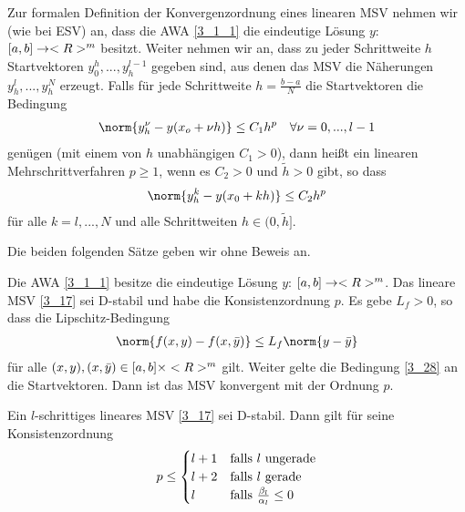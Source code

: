 Zur formalen Definition der Konvergenzordnung eines linearen MSV nehmen wir (wie bei ESV) an, dass die AWA \cref{3_1_1} die eindeutige Lösung $y$: $[a,b]\to<R>^m$ besitzt. Weiter nehmen wir an, dass zu jeder Schrittweite $h$ Startvektoren $y_0^h,...,y_h^{l-1}$ gegeben sind, aus denen das MSV die Näherungen $y_h^l,...,y_h^N$ erzeugt. Falls für jede Schrittweite $h=\frac{b-a}{N}$ die Startvektoren die Bedingung
\begin{align}
	\label{3_28}
	\norm{y_h^\nu - y(x_o+\nu h)} \le C_1h^p\quad\forall\nu=0,...,l-1
\end{align}
genügen (mit einem von $h$ unabhängigen $C_1>0$), dann heißt ein linearen Mehrschrittverfahren  $p\ge 1$, wenn es $C_2>0$ und $\tilde{h}>0$ gibt, so dass
\begin{align}
	\norm{y_h^k - y(x_0+kh)} \le C_2h^p \notag
\end{align}
für alle $k=l,...,N$ und alle Schrittweiten $h\in (0,\tilde{h}]$.

Die beiden folgenden Sätze geben wir ohne Beweis an.

\begin{proposition}
	Die AWA \cref{3_1_1} besitze die eindeutige Lösung $y$: $[a,b]\to<R>^m$. Das lineare MSV \cref{3_17} sei D-stabil und habe die Konsistenzordnung $p$. Es gebe $L_f>0$, so dass die Lipschitz-Bedingung
	\begin{align}
		\norm{f(x,y) - f(x,\bar{y})} \le L_f\norm{y-\bar{y}}\notag
	\end{align}
	für alle $(x,y),(x,\bar{y})\in [a,b]\times<R>^m$ gilt. Weiter gelte die Bedingung \cref{3_28} an die Startvektoren. Dann ist das MSV konvergent mit der Ordnung $p$.
\end{proposition}

\begin{proposition}
	Ein $l$-schrittiges lineares MSV \cref{3_17} sei D-stabil. Dann gilt für seine Konsistenzordnung
	\begin{align}
		p \le \begin{cases}
			l+1 & \text{falls } l \text{ ungerade} \\
			l+2 & \text{falls } l \text{ gerade} \\
			l & \text{falls } \frac{\beta_l}{\alpha_l} \le 0
		\end{cases} \notag
	\end{align}
\end{proposition}

